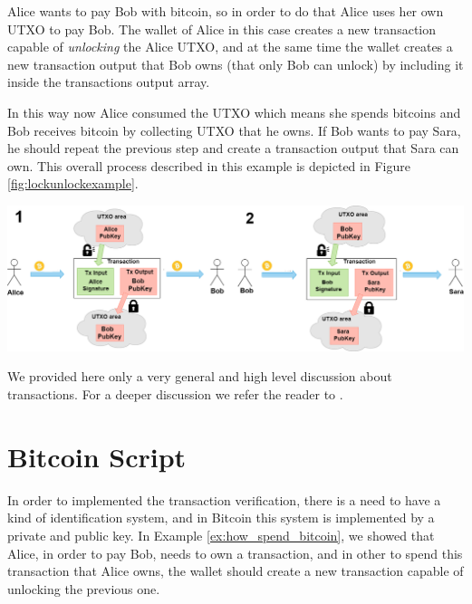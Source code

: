 \begin{example}\label{ex:how_spend_bitcoin}
    Alice wants to pay Bob with bitcoin, so in order to do that Alice
    uses her own UTXO to pay Bob. The wallet of Alice in this case creates a new transaction
    capable of \emph{unlocking} the Alice UTXO, and at the same time the wallet creates 
    a new transaction output that Bob owns (that only Bob can unlock) by including it inside the transactions output array. 

    In this way now Alice consumed the UTXO which means she spends bitcoins and Bob receives bitcoin by collecting UTXO that he owns. 
    If Bob wants to pay Sara, he should repeat the previous step and create a transaction output that Sara can own. This overall process described in this example is depicted in  Figure \ref{fig:lockunlockexample}.

    {\centering
     \vspace{5pt}
      \includegraphics[scale=0.3]{imgs/DiagramUnlocLockUTXO.png}
      \vspace{10pt}
     \par}
\end{example}


We provided here only a very general and high level discussion about transactions. For a deeper discussion we refer the reader to \cite{Palazzo_Estrazione_di_Informazioni_2021}.

\section{Bitcoin Script}

In order to implemented the transaction verification, there is a need to have
a kind of identification system, and in Bitcoin this system is implemented by a private and public key.
In Example \ref{ex:how_spend_bitcoin}, we showed  that Alice, in order to pay Bob, needs to 
own a transaction, and in other to spend this transaction that Alice owns, the wallet should
create a new transaction capable of unlocking the previous one. 

